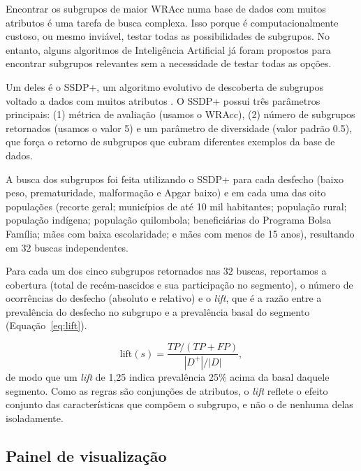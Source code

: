 Encontrar os subgrupos de maior WRAcc numa base de dados com muitos atributos é uma tarefa de busca complexa.
Isso porque é computacionalmente custoso, ou mesmo inviável, testar todas as possibilidades de subgrupos.
No entanto, alguns algoritmos de Inteligência Artificial já foram propostos para encontrar subgrupos relevantes sem a necessidade de testar todas as opções.

Um deles é o SSDP+, um algoritmo evolutivo de descoberta de subgrupos voltado a dados com muitos atributos \cite{lucas2018}.
O SSDP+ possui três parâmetros principais: (1) métrica de avaliação (usamos o WRAcc), (2) número de subgrupos retornados (usamos o valor 5) e um parâmetro de diversidade (valor padrão 0.5), que força o retorno de subgrupos que cubram diferentes exemplos da base de dados.

A busca dos subgrupos foi feita utilizando o SSDP+ para cada desfecho (baixo peso, prematuridade, malformação e Apgar baixo) e em cada uma das oito populações (recorte geral; municípios de até 10 mil habitantes; população rural; população indígena; população quilombola; beneficiárias do Programa Bolsa Família; mães com baixa escolaridade; e mães com menos de 15 anos), resultando em $32$ buscas independentes. 

Para cada um dos cinco subgrupos retornados nas $32$ buscas, reportamos a cobertura (total de recém-nascidos e sua participação no segmento), o número de ocorrências do desfecho (absoluto e relativo) e o \emph{lift}, que é a razão entre a prevalência do desfecho no subgrupo e a prevalência basal do segmento (Equação~\ref{eq:lift}).

\begin{equation}\label{eq:lift}
\mathrm{lift}(s) = \frac{TP/(TP + FP)}{|D^{+}|/|D|},
\end{equation}
de modo que um \emph{lift} de 1,25 indica prevalência 25\% acima da basal daquele segmento. Como as regras são conjunções de atributos, o \emph{lift} reflete o efeito conjunto das características que compõem o subgrupo, e não o de nenhuma delas isoladamente.


\subsection{Painel de visualização}\label{subsec:met-dashboard}

